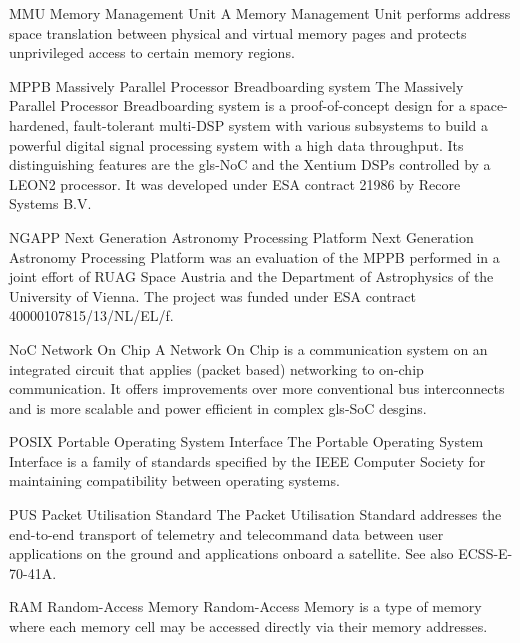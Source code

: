 
%
  {MMU}%
  {Memory Management Unit}%
  {A Memory Management Unit performs address space translation between physical
   and virtual memory pages and protects unprivileged access to certain memory
   regions.}%

%
  {MPPB}%
  {Massively Parallel Processor Breadboarding system}%
  {The Massively Parallel Processor Breadboarding system is a proof-of-concept %
   design for a space-hardened, fault-tolerant multi-DSP system with various %
   subsystems to build a powerful digital signal processing system with a high %
   data throughput. Its distinguishing features are the \gls{gls-NoC} and the
   \gls{Xentium} \glspl{DSP} controlled by a \gls{LEON2} processor.
   It was developed under ESA contract 21986 by Recore Systems B.V.}%

%
  {NGAPP}%
  {Next Generation Astronomy Processing Platform}%
  {Next Generation Astronomy Processing Platform was an evaluation of the
   \gls{MPPB} performed in a joint effort of RUAG Space Austria and the
   Department of Astrophysics of the University of Vienna.
   The project was funded under ESA contract 40000107815/13/NL/EL/f.}%

%
  {NoC}%
  {Network On Chip}%
  {A Network On Chip is a communication system on an integrated circuit that
   applies (packet based) networking to on-chip communication. It offers
   improvements over more conventional bus interconnects and is more scalable
   and power efficient in complex \gls{gls-SoC} desgins.}%

  {POSIX}
  {Portable Operating System Interface}
  {The Portable Operating System Interface is a family of standards specified
   by the IEEE Computer Society for maintaining compatibility between
   operating systems.}%

  {PUS}
  {Packet Utilisation Standard}
  {The Packet Utilisation Standard addresses the end-to-end transport of telemetry
   and telecommand data between user applications on the ground and applications
   onboard a satellite. See also ECSS-E-70-41A.}%

%
  {RAM}%
  {Random-Access Memory}%
  {Random-Access Memory is a type of memory where each memory cell may be
   accessed directly via their memory addresses.}%

